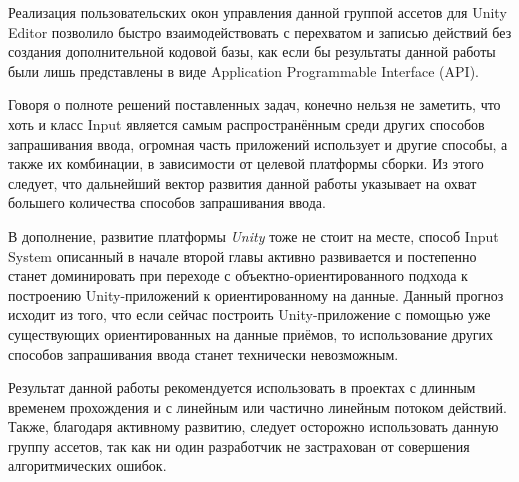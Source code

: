 Реализация пользовательских окон управления данной группой ассетов для Unity Editor позволило быстро взаимодействовать с перехватом и записью действий без создания дополнительной кодовой базы, как если бы результаты данной работы были лишь представлены в виде Application Programmable Interface (API).

Говоря о полноте решений поставленных задач, конечно нельзя не заметить, что хоть и класс Input является самым распространённым среди других способов запрашивания ввода, огромная часть приложений использует и другие способы, а также их комбинации, в зависимости от целевой платформы сборки. Из этого следует, что дальнейший вектор развития данной работы указывает на охват большего количества способов запрашивания ввода. 

В дополнение, развитие платформы \textit{Unity} тоже не стоит на месте, способ Input System описанный в начале второй главы активно развивается и постепенно станет доминировать при переходе с объектно-ориентированного подхода к построению Unity-приложений к ориентированному на данные. Данный прогноз исходит из того, что если сейчас построить Unity-приложение с помощью уже существующих ориентированных на данные приёмов, то использование других способов запрашивания ввода станет технически невозможным.

Результат данной работы рекомендуется использовать в проектах с длинным временем прохождения и с линейным или частично линейным потоком действий. Также, благодаря активному развитию, следует осторожно использовать данную группу ассетов, так как ни один разработчик не застрахован от совершения алгоритмических ошибок.